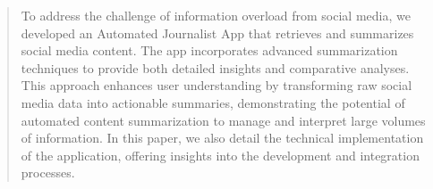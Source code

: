 \begin{abstract}
    To address the challenge of information overload from social media, we developed an Automated Journalist App that retrieves and summarizes social media content. The app incorporates advanced summarization techniques to provide both detailed insights and comparative analyses. This approach enhances user understanding by transforming raw social media data into actionable summaries, demonstrating the potential of automated content summarization to manage and interpret large volumes of information. In this paper, we also detail the technical implementation of the application, offering insights into the development and integration processes.
\end{abstract}
